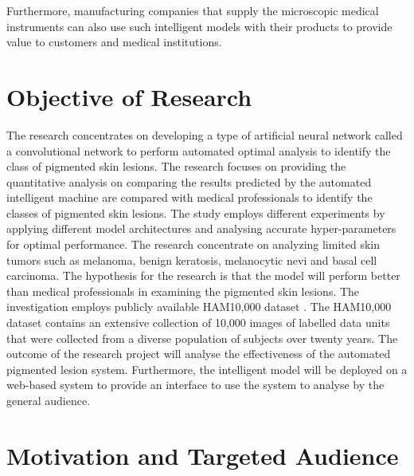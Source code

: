 Furthermore, manufacturing companies that supply the microscopic medical instruments can also use such intelligent models with their products to provide value to customers and medical institutions.

\section{Objective of Research}
The research concentrates on developing a type of artificial neural network called a convolutional network to perform automated optimal analysis to identify the class of pigmented skin lesions. 
The research focuses on providing the quantitative analysis on comparing the results predicted by the automated intelligent machine are compared with medical professionals to identify the classes of pigmented skin lesions. The study employs different experiments by applying different model architectures and analysing accurate hyper-parameters for optimal performance. 
The research concentrate on analyzing limited skin tumors such as melanoma, 
benign keratosis, melanocytic nevi and basal cell carcinoma. The hypothesis for the research is that the model will perform 
better than medical professionals in examining the pigmented skin lesions. The investigation employs publicly available HAM10,000 dataset \citep{DVN/DBW86T_2018}. 
The HAM10,000 dataset contains an extensive collection of 10,000 images of labelled data units that were collected from a diverse population of subjects over twenty years.
The outcome of the research project will analyse the effectiveness of the automated pigmented 
lesion system. Furthermore, the intelligent model will be deployed on a web-based system to provide an interface to use the system to analyse by the general audience.
\pagebreak

\section{Motivation and Targeted Audience}

